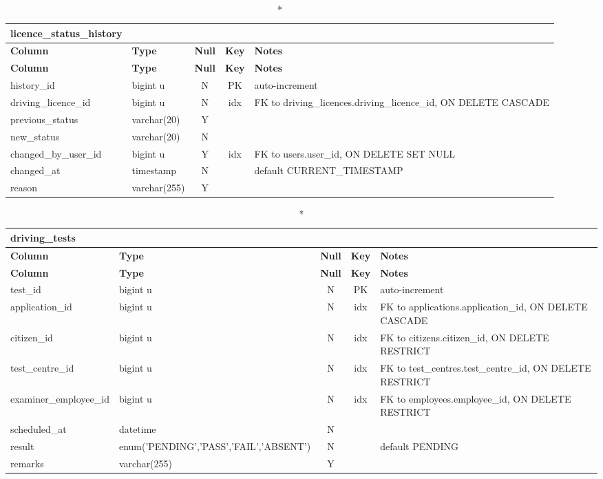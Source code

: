 \vspace{-0.4em}
\begin{longtable}{@{}p{3.4cm}p{2.9cm}c c p{5.6cm}@{}}
\caption*{\textbf{licence\_\allowbreak{}status\_\allowbreak{}history}}\\
\toprule \textbf{Column} & \textbf{Type} & \textbf{Null} & \textbf{Key} & \textbf{Notes} \\ \midrule \endfirsthead
\toprule \textbf{Column} & \textbf{Type} & \textbf{Null} & \textbf{Key} & \textbf{Notes} \\ \midrule \endhead
\bottomrule \endlastfoot
history\_\allowbreak{}id & bigint u & N & PK & auto-increment \\
driving\_\allowbreak{}licence\_\allowbreak{}id & bigint u & N & idx & FK to driving\_\allowbreak{}licences.driving\_\allowbreak{}licence\_\allowbreak{}id, ON DELETE CASCADE \\
previous\_\allowbreak{}status & varchar(20) & Y &  &  \\
new\_\allowbreak{}status & varchar(20) & N &  &  \\
changed\_\allowbreak{}by\_\allowbreak{}user\_\allowbreak{}id & bigint u & Y & idx & FK to users.user\_\allowbreak{}id, ON DELETE SET NULL \\
changed\_\allowbreak{}at & timestamp & N &  & default CURRENT\_\allowbreak{}TIMESTAMP \\
reason & varchar(255) & Y &  &  \\
\end{longtable}
\vspace{-0.4em}
\begin{longtable}{@{}p{3.4cm}p{2.9cm}c c p{5.6cm}@{}}
\caption*{\textbf{driving\_\allowbreak{}tests}}\\
\toprule \textbf{Column} & \textbf{Type} & \textbf{Null} & \textbf{Key} & \textbf{Notes} \\ \midrule \endfirsthead
\toprule \textbf{Column} & \textbf{Type} & \textbf{Null} & \textbf{Key} & \textbf{Notes} \\ \midrule \endhead
\bottomrule \endlastfoot
test\_\allowbreak{}id & bigint u & N & PK & auto-increment \\
application\_\allowbreak{}id & bigint u & N & idx & FK to applications.application\_\allowbreak{}id, ON DELETE CASCADE \\
citizen\_\allowbreak{}id & bigint u & N & idx & FK to citizens.citizen\_\allowbreak{}id, ON DELETE RESTRICT \\
test\_\allowbreak{}centre\_\allowbreak{}id & bigint u & N & idx & FK to test\_\allowbreak{}centres.test\_\allowbreak{}centre\_\allowbreak{}id, ON DELETE RESTRICT \\
examiner\_\allowbreak{}employee\_\allowbreak{}id & bigint u & N & idx & FK to employees.employee\_\allowbreak{}id, ON DELETE RESTRICT \\
scheduled\_\allowbreak{}at & datetime & N &  &  \\
result & enum('PENDING',\allowbreak{}'PASS',\allowbreak{}'FAIL',\allowbreak{}'ABSENT') & N &  & default PENDING \\
remarks & varchar(255) & Y &  &  \\
\end{longtable}
\vspace{-0.4em}
